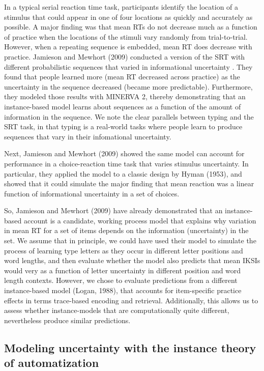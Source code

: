\documentclass[,man,floatsintext]{apa6}
\begin{document}
In a typical serial reaction time task, participants identify the location of a stimulus that could appear in one of four locations as quickly and accurately as possible. A major finding was that mean RTs do not decrease much as a function of practice when the locations of the stimuli vary randomly from trial-to-trial. However, when a repeating sequence is embedded, mean RT does decrease with practice. Jamieson and Mewhort (2009) conducted a version of the SRT with different probabilistic sequences that varied in informational uncertainty . They found that people learned more (mean RT decreased across practice) as the uncertainty in the sequence decreased (became more predictable). Furthermore, they modeled those results with MINERVA 2, thereby demonstrating that an instance-based model learns about sequences as a function of the amount of information in the sequence. We note the clear parallels between typing and the SRT task, in that typing is a real-world tasks where people learn to produce sequences that vary in their infomational uncertainty.

Next, Jamieson and Mewhort (2009) showed the same model can account for performance in a choice-reaction time task that varies stimulus uncertainty. In particular, they applied the model to a classic design by Hyman (1953), and showed that it could simulate the major finding that mean reaction was a linear function of informational uncertainty in a set of choices.

So, Jamieson and Mewhort (2009) have already demonstrated that an instance-based account is a candidate, working process model that explains why variation in mean RT for a set of items depends on the information (uncertainty) in the set. We assume that in principle, we could have used their model to simulate the process of learning type letters as they occur in different letter positions and word lengths, and then evaluate whether the model also predicts that mean IKSIs would very as a function of letter uncertainty in different position and word length contexts. However, we chose to evaluate predictions from a different instance-based model (Logan, 1988), that accounts for item-specific practice effects in terms trace-based encoding and retrieval. Additionally, this allows us to assess whether instance-models that are computationally quite different, nevertheless produce similar predictions.

\hypertarget{modeling-uncertainty-with-the-instance-theory-of-automatization}{%
\subsection{Modeling uncertainty with the instance theory of automatization}\label{modeling-uncertainty-with-the-instance-theory-of-automatization}}
\end{document}
